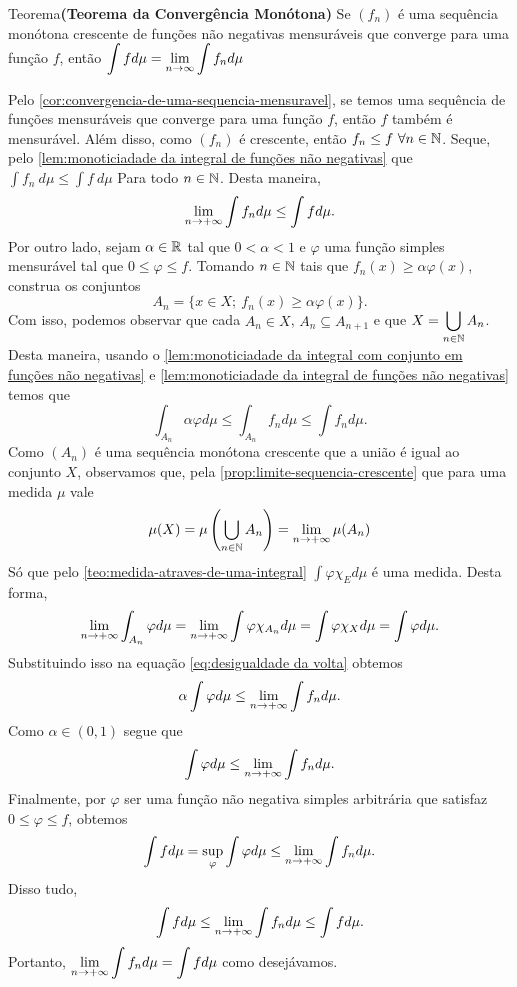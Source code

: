 \begin{env}{Teorema}\textbf{(Teorema da Convergência Monótona)}
	\label{teo:Convergencia Monótona}
	Se $(f_n)$ é uma sequência monótona crescente de funções não negativas mensuráveis que converge para uma função $f$, então
	$ \displaystyle
	\int f d\mu = \displaystyle \lim_{n \to \infty} \int f_n d\mu
	$
\end{env}
\begin{prova}
	Pelo \ref{cor:convergencia-de-uma-sequencia-mensuravel}, se temos uma sequência de funções mensuráveis que converge para uma função $f$, então $f$ também é mensurável.
	Além disso,
	como $(f_n)$ é crescente, então $f_n \leq f\ \forall n \in \operatorname{\mathbb{N}}$.
	Seque, pelo \ref{lem:monoticiadade da integral de funções não negativas} que 
	$ \displaystyle
	\int f_n\ d\mu \leq \int f\ d\mu
	$
	Para todo $n \in \operatorname{\mathbb{N}}$.
	Desta maneira, 
	$$
	\displaystyle \lim_{n \to +\infty}\int f_n d\mu \leq \int f d\mu.
	$$
	Por outro lado, sejam $\alpha \in \mathbb{R}$ tal que $0 < \alpha <1$ e 
	$\varphi$ uma função simples mensurável tal que $0 \leq \varphi \leq f$.
	Tomando $n \in \operatorname{\mathbb{N}}$ tais que $f_n(x) \geq \alpha \varphi(x)$, construa
	os conjuntos 
	$$
	A_n =\{x \in X ;\ f_n(x) \geq \alpha \varphi(x)\}.
	$$
	Com isso, podemos observar que cada $A_n \in X$, $A_{n} \subseteq A_{n+1}$
	e que $X = \displaystyle \bigcup_{n \in \operatorname{\mathbb{N}}}A_n$.
	Desta maneira, usando o  \ref{lem:monoticiadade da integral com conjunto em funções não negativas} e \ref{lem:monoticiadade da integral de funções não negativas} temos que 
	\begin{equation}
		\label{eq:desigualdade da volta}
		\int_{A_n} \alpha\varphi d\mu
		\leq
		\int_{A_n} f_n d\mu
		\leq
		\int f_n d\mu.		
	\end{equation}
	Como $(A_n)$ é uma sequência monótona crescente que a união é igual ao conjunto $X$, observamos que, pela  \ref{prop:limite-sequencia-crescente} que para uma medida $\mu$ vale
	$$
	\mu(X) = \mu\left(\bigcup_{n \in \operatorname{\mathbb{N}}}A_n\right) = \lim_{n \to +\infty} \mu(A_n)
	$$
	Só que pelo  \ref{teo:medida-atraves-de-uma-integral} $\int \varphi \chi_E d\mu$ é uma medida.
	Desta forma, 
	$$
	\displaystyle \lim_{n \to +\infty} \int_{A_n} \varphi d\mu 
	= \displaystyle \lim_{n \to +\infty} \int \varphi \chi_{A_n} d\mu
	= \int \varphi \chi_X d\mu
	= \int \varphi d\mu.
	$$
	Substituindo isso na equação \ref{eq:desigualdade da volta} obtemos
	$$
	\alpha \int \varphi d\mu \leq \displaystyle \lim_{n \to +\infty} \int f_n d\mu.
	$$
	Como $\alpha \in (0,1)$ segue que
	$$
	\int \varphi d\mu \leq \displaystyle \lim_{n \to +\infty} \int f_n d\mu.
	$$
	Finalmente, por $\varphi$ ser uma função não negativa simples arbitrária que satisfaz $0\leq \varphi \leq f$, obtemos
	$$
	\int f d\mu 
	= \sup_{\varphi} \int \varphi d\mu \leq \displaystyle \lim_{n \to +\infty}\int f_n d\mu.
	$$
	Disso tudo,
	$$
	\int f d\mu 
	\leq 
	\displaystyle \lim_{n \to +\infty}\int f_n d\mu
	\leq
	\int f d\mu.
	$$
	Portanto,  $\displaystyle \displaystyle \lim_{n \to +\infty}\int f_n d\mu
	=
	\int f d\mu$ como desejávamos.
\end{prova}

